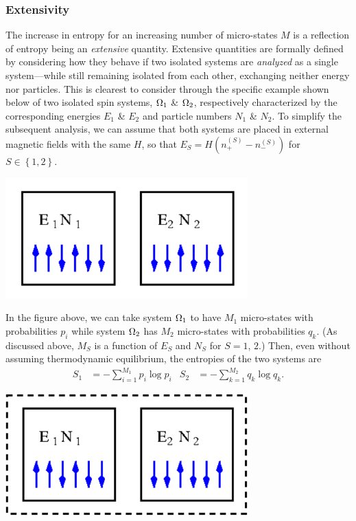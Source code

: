 \subsubsection{Extensivity}
The increase in entropy for an increasing number of micro-states $M$ is a reflection of entropy being an \textit{extensive} quantity.
Extensive quantities are formally defined by considering how they behave if two isolated systems are \textit{analyzed} as a single system---while still remaining isolated from each other, exchanging neither energy nor particles.
This is clearest to consider through the specific example shown below of two isolated spin systems, $\Omega_1$ \& $\Omega_2$, respectively characterized by the corresponding energies $E_1$ \& $E_2$ and particle numbers $N_1$ \& $N_2$.
To simplify the subsequent analysis, we can assume that both systems are placed in external magnetic fields with the same $H$, so that $E_S = H\left(n_+^{(S)} - n_-^{(S)}\right)$ for $S \in \left\{1, 2\right\}$.
\begin{center}
  \includegraphics[width=0.7\textwidth]{figs/week02_entropy-separate.pdf}
\end{center}

In the figure above, we can take system $\Omega_1$ to have $M_1$ micro-states with probabilities $p_i$ while system $\Omega_2$ has $M_2$ micro-states with probabilities $q_k$.
(As discussed above, $M_S$ is a function of $E_S$ and $N_S$ for $S = 1$, $2$.)
Then, even without assuming thermodynamic equilibrium, the entropies of the two systems are
\begin{align*}
  S_1 & = - \sum_{i = 1}^{M_1} p_i \log p_i &
  S_2 & = - \sum_{k = 1}^{M_2} q_k \log q_k.
\end{align*}

\begin{center}
  \includegraphics[width=0.7\textwidth]{figs/week02_entropy-combo.pdf}
\end{center}

